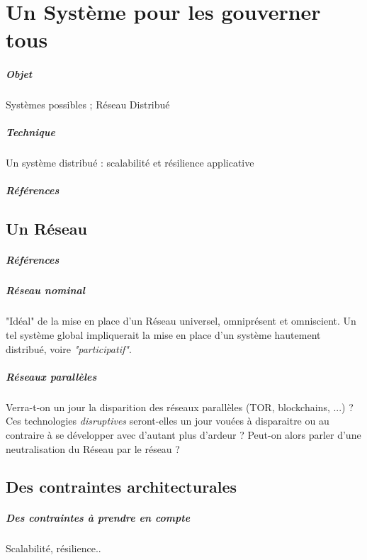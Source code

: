 \chapter{Un Système pour les gouverner tous}
\paragraph{Objet} Systèmes possibles ; Réseau Distribué
\paragraph{Technique} Un système distribué : scalabilité et résilience applicative
\paragraph{Références}
\cite{Deleuze:0}
\cite{Foucault:0}
\cite{Negri:0}
\cite{Pieces:0}
\cite{ProgrammableCity:0}
\cite{ProgrammableCity:1}
\cite{PsychoPass}

\section{Un Réseau}
\paragraph{Références} \cite{DarkWeb:0}

\paragraph{Réseau \emph{nominal}} "Idéal" de la mise en place d'un Réseau universel, omniprésent
et omniscient. Un tel système global impliquerait la mise en place d'un système hautement
distribué, voire \emph{"participatif"}.

\paragraph{Réseaux parallèles} Verra-t-on un jour la disparition des réseaux parallèles
(TOR, blockchains, ...) ? Ces technologies \emph{disruptives} seront-elles un jour vouées
à disparaitre ou au contraire à se développer avec d'autant plus d'ardeur ? Peut-on alors
parler d'une neutralisation du Réseau par le réseau ?


\section{Des contraintes architecturales}
\paragraph{Des contraintes à prendre en compte} Scalabilité, résilience..
